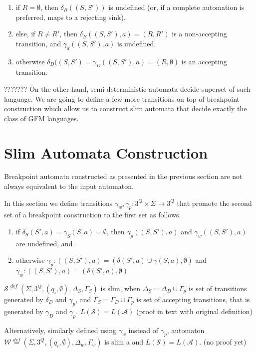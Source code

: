\documentclass[
	digital
nolof, nolot
]{fithesis3}
\newcommand{\cA}{\mathcal{A}}
\newcommand{\cS}{\mathcal{S}}
\newcommand{\lA}{L(\cA)}
\newcommand{\lS}{L(\cS)}
\newcommand{\eqdef}{\overset{def}{=}}
\begin{document}
			\begin{enumerate}
				\item if $R=\emptyset$, then $\delta_B((S,S'))$ is undefined (or, if a complete automation is preferred, maps to a rejecting sink),
				\item else, if $R \neq R'$, then $\delta_B((S,S'),a)=(R, R')$ is a non-accepting transition,
				and $\gamma_d((S,S'),a)$ is undefined.
				\item otherwise $\delta_D((S,S')=\gamma_D((S,S'),a)=(R, \emptyset)$ is an accepting transition.
			\end{enumerate}
			
			??????? On the other hand, semi-deterministic automata decide superset of such language. We are going to define a few more transitions on top of breakpoint construction which allow us to construct slim automata that decide exactly the class of GFM languages.
			
			\section{Slim Automata Construction}
			Breakpoint automata constructed as presented in the previous section are not always equivalent to the input automaton.
			
			In this section we define transitions  $\gamma_w, \gamma_p:3^Q \times \Sigma \rightarrow 3^Q$ that promote the second set of a breakpoint construction to the first set as follows. 
			
			\begin{enumerate}
				\item if $\delta_S(S',a) = \gamma_S(S, a) = \emptyset$, then $\gamma_{p}((S,S'), a)$ and $\gamma_{w}((S,S'), a)$ are undefined, and
				\item otherwise
				$\gamma_{p}:((S,S'),a)=(\delta(S',a)\cup\gamma(S, a),\emptyset)$ and $\gamma_{w}:((S,S'),a)=(\delta(S',a),\emptyset)$
			\end{enumerate}
			
			
			$\cS\eqdef(\Sigma, 3^Q, (q_i,\emptyset), \Delta_S ,\Gamma_S)$ is slim, when
			$\Delta_S=\Delta_D \cup \Gamma_p$ is set of transitions generated by $\delta_D$ and $\gamma_p$, and
			$\Gamma_S=\Gamma_D \cup \Gamma_p$ is set of accepting transitions, that is generated by $\gamma_D$ and $\gamma_p$. $\lS = \lA$ (proof in text with original definition)
			
			Alternatively, similarly defined using $\gamma_w$ instead of $\gamma_{p}$, automaton $\mathcal{W}\eqdef(\Sigma, 3^Q, (q_i,\emptyset), \Delta_w, \Gamma_w)$ is slim a and $\lS=\lA$. (no proof yet)
\end{document}
